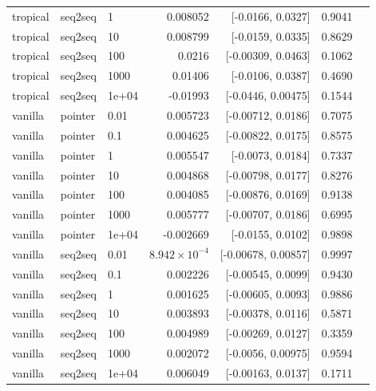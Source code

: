 \documentclass[10pt]{article}
\begin{document}
{\begin{longtable}{lllrrrl}
tropical & seq2seq & 1 & 0.008052 & [-0.0166, 0.0327] & 0.9041 & \\
tropical & seq2seq & 10 & 0.008799 & [-0.0159, 0.0335] & 0.8629 & \\
tropical & seq2seq & 100 & 0.0216 & [-0.00309, 0.0463] & 0.1062 & \\
tropical & seq2seq & 1000 & 0.01406 & [-0.0106, 0.0387] & 0.4690 & \\
tropical & seq2seq & 1e+04 & -0.01993 & [-0.0446, 0.00475] & 0.1544 & \\
vanilla & pointer & 0.01 & 0.005723 & [-0.00712, 0.0186] & 0.7075 & \\
vanilla & pointer & 0.1 & 0.004625 & [-0.00822, 0.0175] & 0.8575 & \\
vanilla & pointer & 1 & 0.005547 & [-0.0073, 0.0184] & 0.7337 & \\
vanilla & pointer & 10 & 0.004868 & [-0.00798, 0.0177] & 0.8276 & \\
vanilla & pointer & 100 & 0.004085 & [-0.00876, 0.0169] & 0.9138 & \\
vanilla & pointer & 1000 & 0.005777 & [-0.00707, 0.0186] & 0.6995 & \\
vanilla & pointer & 1e+04 & -0.002669 & [-0.0155, 0.0102] & 0.9898 & \\
vanilla & seq2seq & 0.01 & $8.942\times10^{-4}$ & [-0.00678, 0.00857] & 0.9997 & \\
vanilla & seq2seq & 0.1 & 0.002226 & [-0.00545, 0.0099] & 0.9430 & \\
vanilla & seq2seq & 1 & 0.001625 & [-0.00605, 0.0093] & 0.9886 & \\
vanilla & seq2seq & 10 & 0.003893 & [-0.00378, 0.0116] & 0.5871 & \\
vanilla & seq2seq & 100 & 0.004989 & [-0.00269, 0.0127] & 0.3359 & \\
vanilla & seq2seq & 1000 & 0.002072 & [-0.0056, 0.00975] & 0.9594 & \\
vanilla & seq2seq & 1e+04 & 0.006049 & [-0.00163, 0.0137] & 0.1711 & \\
\bottomrule
\end{longtable}
}
\end{document}
